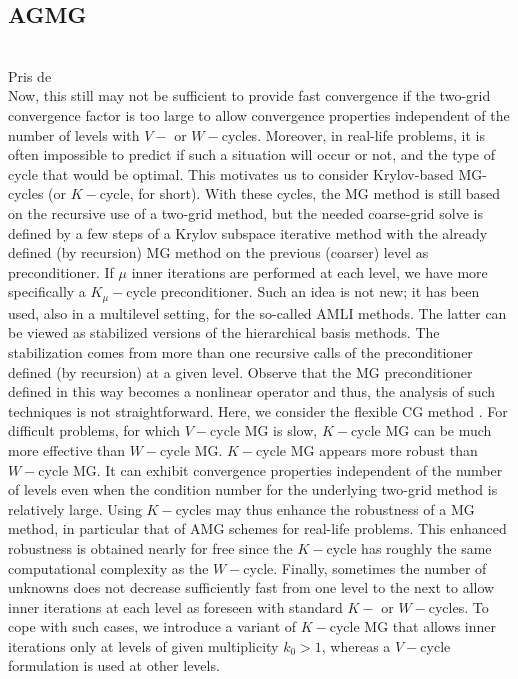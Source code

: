 \subsection{AGMG}
\cite{agmg_guide}\\
Pris de \cite{k_cycle}\\
Now, this still may not be sufficient to provide fast convergence if the 
two-grid convergence factor is too large to allow convergence properties 
independent of the number of levels with $V-$ or $W-$cycles. Moreover, in 
real-life problems, it is often impossible to predict if such a situation 
will occur or not, and the type of cycle that would be optimal. This motivates 
us to consider Krylov-based MG-cycles (or $K-$cycle, for short). With these 
cycles, the MG method is still based on the recursive use of a two-grid method, 
but the needed coarse-grid solve is defined by a few steps of a Krylov subspace 
iterative method with the already defined (by recursion) MG method on the 
previous (coarser) level as preconditioner. If $\mu$ inner iterations are 
performed at each level, we have more specifically a $K_{\mu}-$cycle 
preconditioner. Such an idea is not new; it has been used, also in a multilevel 
setting, for the so-called AMLI methods. The latter can be viewed as stabilized 
versions of the hierarchical basis methods. The stabilization comes from more 
than one recursive calls of the preconditioner defined (by recursion) at a given 
level. Observe that the MG preconditioner defined in this way becomes a 
nonlinear operator and thus, the analysis of such techniques is not straightforward. 
Here, we consider the flexible CG method \cite{fcg,fcg_2,fcg_3,fcg_4}. For 
difficult problems, for which $V-$cycle MG is slow, $K-$cycle MG can be much 
more effective than $W-$cycle MG. $K-$cycle MG appears more robust than $W-$cycle 
MG. It can exhibit convergence properties independent of the number of levels 
even when the condition number for the underlying two-grid method is relatively 
large. Using $K-$cycles may thus enhance the robustness of a MG method, in 
particular that of AMG schemes for real-life problems. This enhanced robustness is
obtained nearly for free since the $K-$cycle has roughly the same
computational complexity as the $W-$cycle. Finally, sometimes the number of
unknowns does not decrease sufficiently fast from one level to the next to
allow inner iterations at each level as foreseen with standard $K-$ or
$W-$cycles. To cope with such cases, we introduce a variant of $K-$cycle MG
that allows inner iterations only at levels of given multiplicity $k_0>1$,
whereas a $V-$cycle formulation is used at other levels.

